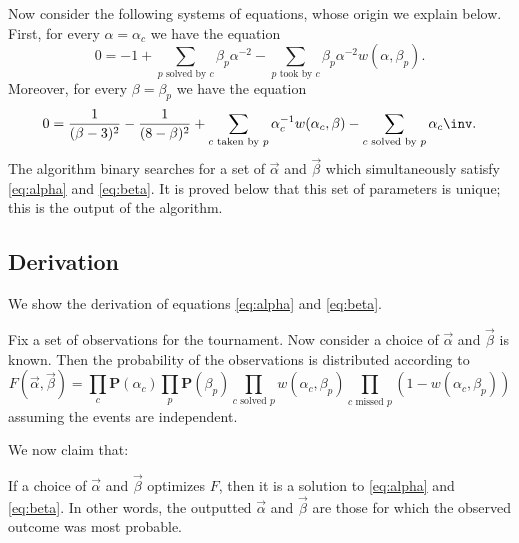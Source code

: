 Now consider the following systems of equations,
whose origin we explain below.
First, for every $\alpha = \alpha_c$ we have the equation
\begin{equation}
	0 = -1 + \sum_{\text{$p$ solved by $c$}} \beta_p\alpha^{-2}
		- \sum_{\text{$p$ took by $c$}} \beta_p \alpha^{-2} w(\alpha, \beta_p).
	\label{eq:alpha}
\end{equation}
Moreover, for every $\beta = \beta_p$ we have the equation
\begin{equation}
	0 = \frac{1}{(\beta-3)^2} - \frac{1}{(8-\beta)^2}
		+ \sum_{\text{$c$ taken by $p$}} \alpha_c^{-1} w(\alpha_c, \beta)
		- \sum_{\text{$c$ solved by $p$}} \alpha_c\inv.
	\label{eq:beta}
\end{equation}
The algorithm binary searches for a set of $\vec\alpha$ and $\vec\beta$
which simultaneously satisfy \eqref{eq:alpha} and \eqref{eq:beta}.
It is proved below that this set of parameters is unique;
this is the output of the algorithm.


\subsection{Derivation}
We show the derivation of equations \eqref{eq:alpha} and \eqref{eq:beta}.

Fix a set of observations for the tournament.
Now consider a choice of $\vec\alpha$ and $\vec\beta$ is known.
Then the probability of the observations is distributed according to
\begin{equation}
	F( \vec\alpha, \vec\beta )
	= \prod_{c} \mathbf P(\alpha_c)
	\prod_{p} \mathbf P(\beta_p)
	\prod_{\text{$c$ solved $p$}} w(\alpha_c, \beta_p)
	\prod_{\text{$c$ missed $p$}} (1-w(\alpha_c, \beta_p))
	\label{eq:F}
\end{equation}
assuming the events are independent.

We now claim that:
\begin{proposition}
	If a choice of $\vec\alpha$ and $\vec\beta$ optimizes $F$,
	then it is a solution to \eqref{eq:alpha} and \eqref{eq:beta}.
	In other words, the outputted $\vec\alpha$ and $\vec\beta$
	are those for which the observed outcome was most probable.
\end{proposition}

